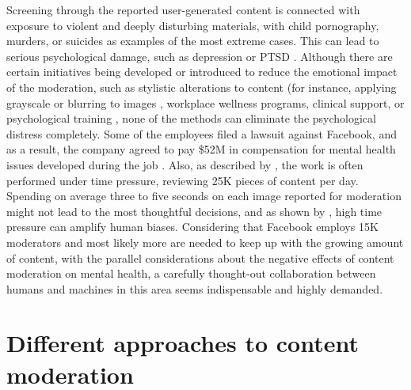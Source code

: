 \documentclass[preprint,12pt]{elsarticle}
\begin{document}
Screening through the reported user-generated content is connected with exposure to violent and deeply disturbing materials, with child pornography, murders, or suicides as examples of the most extreme cases. This can lead to serious psychological damage, such as depression or PTSD \citep{roberts2014behind}. Although there are certain initiatives being developed or introduced to reduce the emotional impact of the moderation, such as stylistic alterations to  content (for instance, applying grayscale or blurring to images
 \citep{karunakaran2019testing}, workplace wellness programs, clinical support, or psychological training \citep{steiger2021psychological}, none of the methods can eliminate the psychological distress completely. Some of the employees filed a lawsuit against Facebook, and as a result, the company agreed to pay \$52M in compensation for mental health issues developed during the job \citep{newton_facebook_2020}. Also, as described by \citet{parks2019dirty}, the work is often performed under time pressure, reviewing 25K pieces of content per day. Spending on average three to five seconds on each image reported for moderation might not lead to the most thoughtful decisions, and as shown by \citet{stepanikova2012racial}, high time pressure can amplify human biases. Considering that Facebook employs 15K moderators \citep{koetsier_report} and most likely more are needed to keep up with the growing amount of content, with the parallel considerations about the negative effects of content moderation on mental health, a carefully thought-out collaboration between humans and machines in this area seems indispensable and highly demanded.






\section{Different approaches to content moderation}\label{sec:content-moderation}
\end{document}
